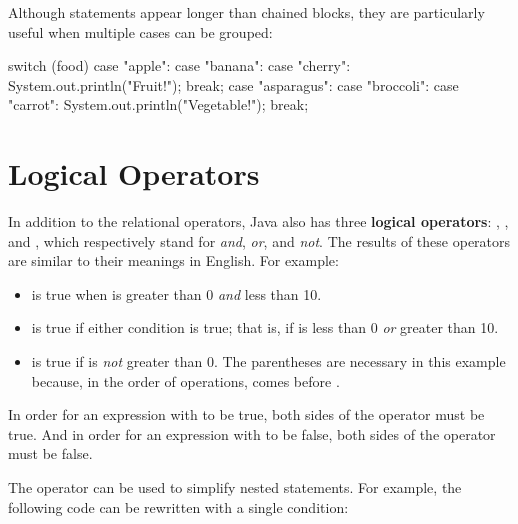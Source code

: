 Although  statements appear longer than chained  blocks, they are particularly useful when multiple cases can be grouped:

\begin{code}
switch (food) {
    case "apple":
    case "banana":
    case "cherry":
        System.out.println("Fruit!");
        break;
    case "asparagus":
    case "broccoli":
    case "carrot":
        System.out.println("Vegetable!");
        break;
}
\end{code}



\section{Logical Operators}


In addition to the relational operators, Java also has three {\bf logical operators}: \java{&&}, \java{||}, and \java{!}, which respectively stand for {\em and}, {\em or}, and {\em not}.
The results of these operators are similar to their meanings in English.
For example:

\begin{itemize}

\item {} is true when  is greater than 0 {\em and} less than 10.

\item {} is true if either condition is true; that is, if  is less than 0 {\em or} greater than 10.

\item {} is true if  is {\em not} greater than 0.
The parentheses are necessary in this example because, in the order of operations, \java{!} comes before \java{>}.

\end{itemize}

In order for an expression with \java{&&} to be true, both sides of the \java{&&} operator must be true.
And in order for an expression with \java{||} to be false, both sides of the \java{||} operator must be false.

The \java{&&} operator can be used to simplify nested  statements.
For example, the following code can be rewritten with a single condition:

